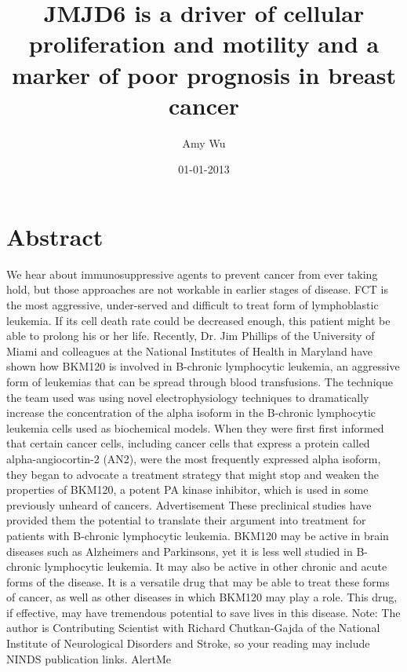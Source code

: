\documentclass{article}%
\title{JMJD6 is a driver of cellular proliferation and motility and a marker of poor prognosis in breast cancer}%
\author{Amy Wu}%
\affil{National Key Laboratory for Crop Genetics and Germplasm Enhancement, Jiangsu Plant Gene Engineering Research Center, Nanjing Agricultural University, Nanjing, 210095, China}%
\date{01{-}01{-}2013}%
\begin{document}
%
\normalsize%
\maketitle%
\section{Abstract}%
\label{sec:Abstract}%
We hear about immunosuppressive agents to prevent cancer from ever taking hold, but those approaches are not workable in earlier stages of disease. FCT is the most aggressive, under{-}served and difficult to treat form of lymphoblastic leukemia. If its cell death rate could be decreased enough, this patient might be able to prolong his or her life.\newline%
Recently, Dr. Jim Phillips of the University of Miami and colleagues at the National Institutes of Health in Maryland have shown how BKM120 is involved in B{-}chronic lymphocytic leukemia, an aggressive form of leukemias that can be spread through blood transfusions.\newline%
The technique the team used was using novel electrophysiology techniques to dramatically increase the concentration of the alpha isoform in the B{-}chronic lymphocytic leukemia cells used as biochemical models.\newline%
When they were first first informed that certain cancer cells, including cancer cells that express a protein called alpha{-}angiocortin{-}2 (AN2), were the most frequently expressed alpha isoform, they began to advocate a treatment strategy that might stop and weaken the properties of BKM120, a potent PA kinase inhibitor, which is used in some previously unheard of cancers.\newline%
Advertisement\newline%
These preclinical studies have provided them the potential to translate their argument into treatment for patients with B{-}chronic lymphocytic leukemia.\newline%
BKM120 may be active in brain diseases such as Alzheimers and Parkinsons, yet it is less well studied in B{-}chronic lymphocytic leukemia. It may also be active in other chronic and acute forms of the disease.\newline%
It is a versatile drug that may be able to treat these forms of cancer, as well as other diseases in which BKM120 may play a role. This drug, if effective, may have tremendous potential to save lives in this disease.\newline%
Note: The author is Contributing Scientist with Richard Chutkan{-}Gajda of the National Institute of Neurological Disorders and Stroke, so your reading may include NINDS publication links.\newline%
AlertMe
\end{document}
